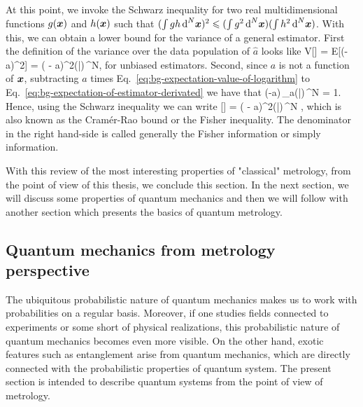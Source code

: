 At this point, we invoke the Schwarz inequality for two real multidimensional functions $g(\boldsymbol{x})$ and $h(\boldsymbol{x})$ such that $(\int g h \,\text{d}^N\boldsymbol{x})^2\leqslant (\int g^2 \,\text{d}^N\boldsymbol{x}) (\int h^2 \,\text{d}^N\boldsymbol{x})$.
With this, we can obtain a lower bound for the variance of a general estimator.
First the definition of the variance over the data population of $\hat{a}$ looks like
\be
  V[] = E[(-a)^2] = \int ( - a)^2\prob(|)\,^N,
\ee
for unbiased estimators.
Second, since $a$ is not a function of $\boldsymbol{x}$, subtracting $a$ times Eq.~\eqref{eq:bg-expectation-value-of-logarithm} to Eq.~\eqref{eq:bg-expectation-of-estimator-derivated} we have that
\be
  \int (-a)\,\partial_a \prob(|)\,^N = 1.
\ee
Hence, using the Schwarz inequality we can write
\be
  \label{eq:bg-classical-cr-bound-and-fi}
  [] = \int ( - a)^2\prob(|)\,^N \geqslant {},
\ee
which is also known as the Cram\'er-Rao bound or the Fisher inequality.
The denominator in the right hand-side is called generally the Fisher information or simply information.

With this review of the most interesting properties of "classical" metrology, from the point of view of this thesis, we conclude this section.
In the next section, we will discuss some properties of quantum mechanics and then we will follow with another section which presents the basics of quantum metrology.

\subsection{Quantum mechanics from metrology perspective}
\label{sec:bg-quantum-mechanics-for-metrology}

The ubiquitous probabilistic nature of quantum mechanics makes us to work with probabilities on a regular basis.
Moreover, if one studies fields connected to experiments or some short of physical realizations, this probabilistic nature of quantum mechanics becomes even more visible.
On the other hand, exotic features such as entanglement arise from quantum mechanics, which are directly connected with the probabilistic properties of quantum system.
The present section is intended to describe quantum systems from the point of view of metrology.

